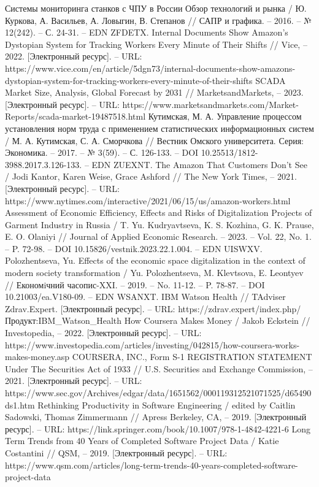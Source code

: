 \documentclass{article}
\begin{document}
\begin{thebibliography}{2}
 Системы мониторинга станков с ЧПУ в России Обзор технологий и рынка / Ю. Куркова, А. Васильев, А. Ловыгин, В. Степанов // САПР и графика. – 2016. – № 12(242). – С. 24-31. – EDN ZFDETX.
 Internal Documents Show Amazon’s Dystopian System for Tracking Workers Every Minute of Their Shifts // Vice, – 2022. [Электронный ресурс]. – URL: https://www.vice.com/en/article/5dgn73/internal-documents-show-amazons-dystopian-system-for-tracking-workers-every-minute-of-their-shifts
 SCADA Market Size, Analysis, Global Forecast by 2031 // MarketsandMarkets, – 2023. [Электронный ресурс]. – URL: https://www.marketsandmarkets.com/Market-Reports/scada-market-19487518.html
 Кутимская, М. А. Управление процессом установления норм труда с применением статистических информационных систем / М. А. Кутимская, С. А. Сморчкова // Вестник Омского университета. Серия: Экономика. – 2017. – № 3(59). – С. 126-133. – DOI 10.25513/1812-3988.2017.3.126-133. – EDN ZUEXNT.
 The Amazon That Customers Don’t See / Jodi Kantor, Karen Weise, Grace Ashford // The New York Times, – 2021. [Электронный ресурс]. – URL: https://www.nytimes.com/interactive/2021/06/15/us/amazon-workers.html
 Assessment of Economic Efficiency, Effects and Risks of Digitalization Projects of Garment Industry in Russia / T. Yu. Kudryavtseva, K. S. Kozhina, G. K. Prause, E. O. Olaniyi // Journal of Applied Economic Research. – 2023. – Vol. 22, No. 1. – P. 72-98. – DOI 10.15826/vestnik.2023.22.1.004. – EDN UISWXV.
 Polozhentseva, Yu. Effects of the economic space digitalization in the context of modern society transformation / Yu. Polozhentseva, M. Klevtsova, E. Leontyev // Економiчний часопис-XXI. – 2019. – No. 11-12. – P. 78-87. – DOI 10.21003/ea.V180-09. – EDN WSANXT.
 IBM Watson Health // TAdviser Zdrav.Expert. [Электронный ресурс]. – URL:  https://zdrav.expert/index.php/Продукт:IBM\_Watson\_Health
 How Coursera Makes Money / Jakob Eckstein // Investopedia, – 2022. [Электронный ресурс]. – URL: https://www.investopedia.com/articles/investing/042815/how-coursera-works-makes-money.asp
 COURSERA, INC., Form S-1 REGISTRATION STATEMENT Under The Securities Act of 1933 // U.S. Securities and Exchange Commission, – 2021. [Электронный ресурс]. – URL: https://www.sec.gov/Archives/edgar/data/1651562/000119312521071525/d65490ds1.htm
 Rethinking Productivity in Software Engineering / edited by Caitlin Sadowski, Thomas Zimmermann // Apress Berkeley, CA, – 2019. [Электронный ресурс]. – URL: https://link.springer.com/book/10.1007/978-1-4842-4221-6
 Long Term Trends from 40 Years of Completed Software Project Data / Katie Costantini // QSM, – 2019. [Электронный ресурс]. – URL: https://www.qsm.com/articles/long-term-trends-40-years-completed-software-project-data
\end{thebibliography} 
\end{document}
